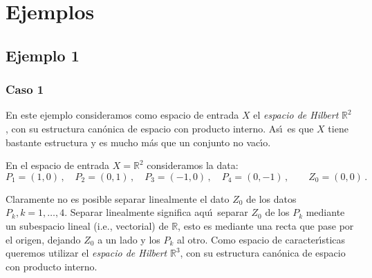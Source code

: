 \newpage
\section{Ejemplos}


\subsection{Ejemplo 1}
\subsubsection{\textbf{Caso 1}}

En este ejemplo consideramos como espacio de entrada $X$ el
{\em espacio de Hilbert\/} $\mathbb{R}^2$, con su estructura
can\'onica de espacio con producto interno.
As\'\i\ es que $X$ tiene bastante estructura y es mucho m\'as que
un conjunto no vac\'\i o.

\smallskip\noindent
En el espacio de entrada $X=\mathbb{R}^2$ consideramos la data:
$$
P_1=(1,0)\,,\quad
P_2=(0,1)\,,\quad
P_3=(-1,0)\,,\quad
P_4=(0,-1)\,,\qquad
Z_0=(0,0)\,.
$$

\begin{center}
\end{center}



Claramente no es posible separar linealmente el dato $Z_0$
de los datos $P_k, k=1, \ldots, 4$.
Separar linealmente significa aqu\'\i\ separar $Z_0$ de los $P_k$
mediante un subespacio lineal (i.e., vectorial) de $\mathbb{R}$,
esto es mediante una recta que pase por el origen, dejando $Z_0$
a un lado y los $P_k$ al otro.
\smallskip\noindent
Como espacio de caracter\'\i sticas queremos utilizar el
{\em espacio de Hilbert\/} $\mathbb{R}^3$, con su estructura
can\'onica de espacio con producto interno.

